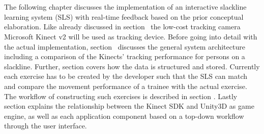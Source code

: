 \chapter{}\label{5_systemIntegration}
The following chapter discusses the implementation of an interactive slackline learning system (SLS) with real-time feedback based on the prior conceptual elaboration.
Like already discussed in section~\textit{} the low-cost tracking camera Microsoft Kinect v2 will be used as tracking device.
Before going into detail with the actual implementation, section~\textit{} discusses the general system architecture including a comparison of the Kinects' tracking performance for persons on a slackline.
Further, section \textit{} covers how the data is structured and stored.
Currently each exercise has to be created by the developer such that the SLS can match and compare the movement performance of a trainee with the actual exercise. 
The workflow of constructing such exercises is described in section \textit{}.
Lastly section \textit{} explains the relationship between the Kinect SDK and Unity3D as game engine, as well as each application component based on a top-down workflow through the user interface.








